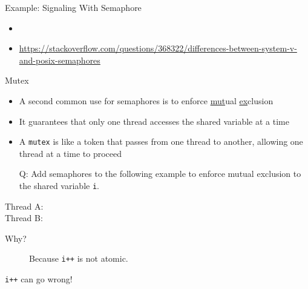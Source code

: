 \begin{frame}{Example: Signaling With Semaphore}%
  \begin{center}
  \end{center}
\end{frame}

\begin{itemize}
\item {}
\item \url{https://stackoverflow.com/questions/368322/differences-between-system-v-and-posix-semaphores}
\end{itemize}

\begin{frame}
  \begin{block}{Mutex}
    \begin{itemize}
    \item A second common use for semaphores is to enforce \underline{mut}ual
      \underline{ex}clusion
    \item It guarantees that only one thread accesses the shared variable at a time
    \item A \texttt{mutex} is like a token that passes from one thread to another, allowing
      one thread at a time to proceed
    \end{itemize}
  \end{block}
  \begin{itemize}
  \item[Q:] Add semaphores to the following example to enforce mutual exclusion to the
    shared variable \texttt{i}.
  \end{itemize}
  \begin{multicols}{2}
    \begin{description}
    \item[Thread A:] 
    \item[Thread B:] 
    \end{description}
  \end{multicols}
  \begin{description}
  \item[Why?] Because \texttt{i++} is not atomic.
  \end{description}
\end{frame}

\begin{frame}{\texttt{i++} {\small can go wrong!}}
\end{frame}

